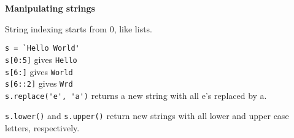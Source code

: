 \textbf{Manipulating strings}

String indexing starts from 0, like lists.

\lstinline|s = `Hello World'|\\
\lstinline|s[0:5]| gives \texttt{Hello}\\
\lstinline|s[6:]| gives \texttt{World}\\
\lstinline|s[6::2]| gives \texttt{Wrd}\\

\lstinline|s.replace('e', 'a')| returns a new string with all e's
replaced by a.  

\lstinline|s.lower()| and \lstinline|s.upper()| return new strings
with all lower and upper case letters, respectively.
